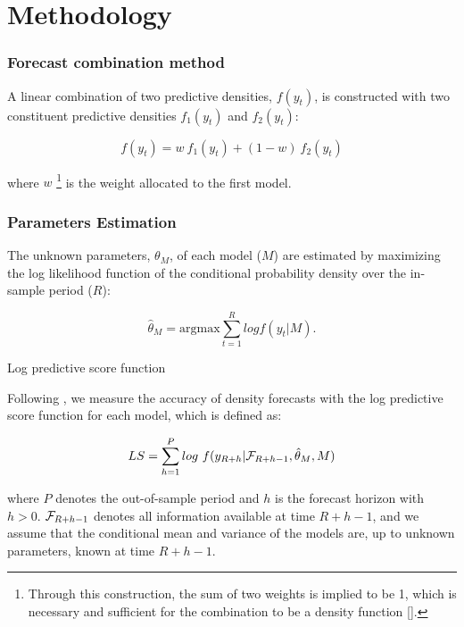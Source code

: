 
\section{Methodology}


\begin{frame}
\label{Figure}
	\frametitle{Forecast combination method}
		
        A linear combination of two predictive densities, $f(y_t)$, is constructed with two constituent predictive densities $f_1(y_t)$ and $f_2(y_t)$:
        
        \vspace{3mm}
        
        \begin{equation}
        f(y_t) = w \ f_1(y_t) + (1-w) \ f_2(y_t)
        \end{equation}  
        
        \vspace{5mm}
        
        where $w$ \footnote{\scriptsize{Through this construction, the sum of two weights is implied to be 1, which is necessary and sufficient for the combination to be a density function [\cite{GA11}].}} is the weight allocated to the first model. 
        
\end{frame}


\begin{frame}
\frametitle{Parameters Estimation}

The unknown parameters, $\theta_M$, of each model ($M$) are estimated by maximizing the log likelihood function of the conditional probability density over the in-sample period ($R$):

\begin{equation}
    \hat\theta_M = \text{argmax} \sum^R_{t=1} log f(y_t|M).
\end{equation}
 
\end{frame}

\begin{frame}{Log predictive score function}

Following \cite{GA11}, we measure the accuracy of density forecasts with the log predictive score function for each model, which is defined as:

\begin{equation}
LS = \sum^P_{h=1} log\ f(y_{\small{R+h}}| \mathcal{F}_{\small{R+h-1}}, \hat\theta_M, M)
\end{equation}

\vspace{5mm}
\scriptsize{where $P$ denotes the out-of-sample period and $h$ is the forecast horizon with $h>0$. $\mathcal{F}_{\small{R+h-1}}$ denotes all information available at time $R+h-1$, and we assume that the conditional mean and variance of the models are, up to unknown parameters, known at time $R+h-1$. }

\end{frame}

